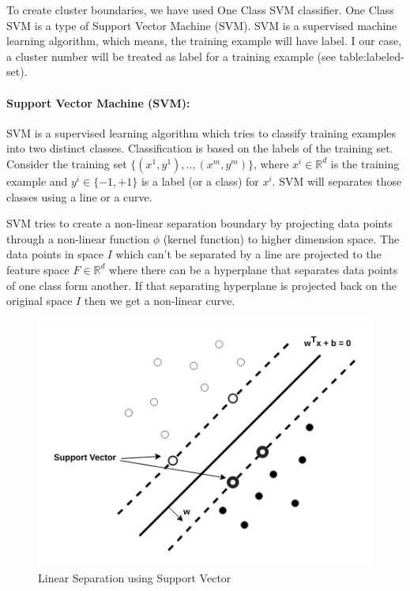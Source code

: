 \documentclass[12pt,oneside,a4paper]{article}
\begin{document}
To create cluster boundaries, we have used One Class SVM classifier. One Class SVM is a type of Support Vector Machine (SVM). SVM is a supervised machine learning algorithm, which means, the training example will have label. I our case, a cluster number will be treated as label for a training example (see table:labeled-set).

\paragraph{Support Vector Machine (SVM):}

SVM is a supervised learning algorithm which tries to classify training examples into two distinct classes. Classification is based on the labels of the training set.
Consider the training set $\{(x^{1},y^{1}), .., (x^{m},y^{m})\}$, where $x^{i} \in \mathbb{R}^d$ is the training example and $y^{i} \in \{-1, +1\}$ is a label (or a class) for $x^{i}$. SVM will separates those classes using a line or a curve.

SVM tries to create a non-linear separation boundary by projecting data points through a non-linear function $\phi$ (kernel function) to higher dimension space. The data points in space $I$ which can't be separated by a line are projected to the feature space $F \in \mathbb{R}^d$ where there can be a hyperplane that separates data points of one class form another. If that separating hyperplane is projected back on the original space $I$ then we get a non-linear curve.\cite{svm}

\begin{figure}[H]
\centering
\includegraphics[scale=0.5]{SVM}
\caption{Linear Separation using Support Vector} \label{fig:SVM}
\end{figure}
\end{document}
